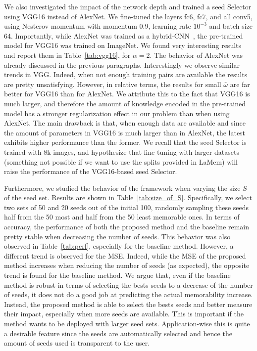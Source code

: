 \documentclass{sig-alternate-05-2015}
\begin{document}
We also investigated the impact of the network depth and trained a seed Selector using VGG16 instead of AlexNet. 
We fine-tuned the layers fc6, fc7, and all conv5, using Nesterov momentum with momentum 0.9, learning rate $10^{-3}$ and batch size 64.
Importantly, while AlexNet was trained as a hybrid-CNN~\cite{khosla2015understanding}, the pre-trained model for VGG16 was trained on ImageNet. We found very interesting results and report them in Table~\ref{tab:vgg16}, for $\alpha=2$. The behavior of AlexNet was already discussed in the previous paragraphs. Interestingly we observe similar trends in VGG. Indeed, when not enough training pairs are available the results are pretty unsatisfying. However, in relative terms, the results for small $\bar{\omega}$ are far better for VGG16 than for AlexNet. We attribute this to the fact that VGG16 is much larger, and therefore the amount of knowledge encoded in the pre-trained model has a stronger regularization effect in our problem than when using AlexNet. The main drawback is that, when enough data are available and since the amount of parameters in VGG16 is much larger than in AlexNet, the latest exhibits higher performance than the former. We recall that the seed Selector is trained with 8k images, and hypothesize that fine-tuning with larger datasets (something not possible if we want to use the splits provided in LaMem) will raise the performance of the VGG16-based seed Selector.


Furthermore, we studied the behavior of the framework when varying the size $S$ of the seed set. Results are shown in Table~\ref{tab:size_of_S}. 
Specifically, we select two sets of 50 and 20 seeds out of the initial 100, randomly sampling these seeds half from the 50 most and half from the 50 least memorable ones.   
In terms of accuracy, the performance of both the proposed method and the baseline remain pretty stable when decreasing the number of seeds. This behavior was also observed in Table~\ref{tab:perf}, especially for the baseline method. However, a different trend is observed for the MSE. Indeed, while the MSE of the proposed method increases when reducing the number of seeds (as expected), the opposite trend is found for the baseline method. We argue that, even if the baseline method is robust in terms of selecting the bests seeds to a decrease of the number of seeds, it does not do a good job at predicting the actual memorability increase. Instead, the proposed method is able to select the bests seeds and better measure their impact, especially when more seeds are available. This is important if the method wants to be deployed with larger seed sets. Application-wise this is quite a desirable feature since the seeds are automatically selected and hence the amount of seeds used is transparent to the user.
\end{document}
